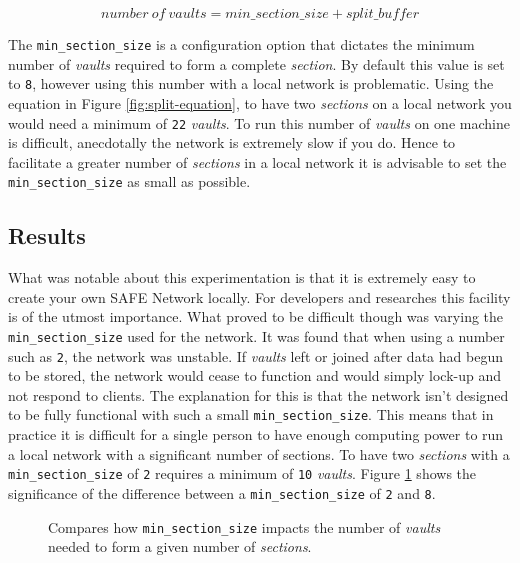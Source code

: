 \begin{equation}
	number\ of\ vaults = min\_section\_size + split\_buffer
	\label{fig:split-equation}
\end{equation}

The \texttt{min\_section\_size} is a configuration option that dictates the minimum number of \textit{vaults} required to form a complete \textit{section}. By default this value is set to \texttt{8}, however using this number with a local network is problematic. Using the equation in Figure \ref{fig:split-equation}, to have two \textit{sections} on a local network you would need a minimum of \texttt{22} \textit{vaults}. To run this number of \textit{vaults} on one machine is difficult, anecdotally the network is extremely slow if you do. Hence to facilitate a greater number of \textit{sections} in a local network it is advisable to set the \texttt{min\_section\_size} as small as possible.

\subsection{Results}

What was notable about this experimentation is that it is extremely easy to create your own SAFE Network locally. For developers and researches this facility is of the utmost importance. What proved to be difficult though was varying the \texttt{min\_section\_size} used for the network. It was found that when using a number such as \texttt{2}, the network was unstable. If \textit{vaults} left or joined after data had begun to be stored, the network would cease to function and would simply lock-up and not respond to clients. The explanation for this is that the network isn't designed to be fully functional with such a small \texttt{min\_section\_size}. This means that in practice it is difficult for a single person to have enough computing power to run a local network with a significant number of sections. To have two \textit{sections} with a \texttt{min\_section\_size} of \texttt{2} requires a minimum of \texttt{10} \textit{vaults}. Figure \ref{fig:min-section-size-graph} shows the significance of the difference between a \texttt{min\_section\_size} of \texttt{2} and \texttt{8}.

\begin{figure}
\centering
{}

\caption{Compares how \texttt{min\_section\_size} impacts the number of \textit{vaults} needed to form a given number of \textit{sections}.}
\label{fig:min-section-size-graph}
\end{figure}

